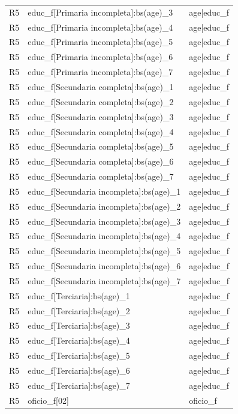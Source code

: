 \begin{longtable}{lll}
R5 & educ\_f[Primaria incompleta]:bs(age)\_3 & age|educ\_f \\
R5 & educ\_f[Primaria incompleta]:bs(age)\_4 & age|educ\_f \\
R5 & educ\_f[Primaria incompleta]:bs(age)\_5 & age|educ\_f \\
R5 & educ\_f[Primaria incompleta]:bs(age)\_6 & age|educ\_f \\
R5 & educ\_f[Primaria incompleta]:bs(age)\_7 & age|educ\_f \\
R5 & educ\_f[Secundaria completa]:bs(age)\_1 & age|educ\_f \\
R5 & educ\_f[Secundaria completa]:bs(age)\_2 & age|educ\_f \\
R5 & educ\_f[Secundaria completa]:bs(age)\_3 & age|educ\_f \\
R5 & educ\_f[Secundaria completa]:bs(age)\_4 & age|educ\_f \\
R5 & educ\_f[Secundaria completa]:bs(age)\_5 & age|educ\_f \\
R5 & educ\_f[Secundaria completa]:bs(age)\_6 & age|educ\_f \\
R5 & educ\_f[Secundaria completa]:bs(age)\_7 & age|educ\_f \\
R5 & educ\_f[Secundaria incompleta]:bs(age)\_1 & age|educ\_f \\
R5 & educ\_f[Secundaria incompleta]:bs(age)\_2 & age|educ\_f \\
R5 & educ\_f[Secundaria incompleta]:bs(age)\_3 & age|educ\_f \\
R5 & educ\_f[Secundaria incompleta]:bs(age)\_4 & age|educ\_f \\
R5 & educ\_f[Secundaria incompleta]:bs(age)\_5 & age|educ\_f \\
R5 & educ\_f[Secundaria incompleta]:bs(age)\_6 & age|educ\_f \\
R5 & educ\_f[Secundaria incompleta]:bs(age)\_7 & age|educ\_f \\
R5 & educ\_f[Terciaria]:bs(age)\_1 & age|educ\_f \\
R5 & educ\_f[Terciaria]:bs(age)\_2 & age|educ\_f \\
R5 & educ\_f[Terciaria]:bs(age)\_3 & age|educ\_f \\
R5 & educ\_f[Terciaria]:bs(age)\_4 & age|educ\_f \\
R5 & educ\_f[Terciaria]:bs(age)\_5 & age|educ\_f \\
R5 & educ\_f[Terciaria]:bs(age)\_6 & age|educ\_f \\
R5 & educ\_f[Terciaria]:bs(age)\_7 & age|educ\_f \\
R5 & oficio\_f[02] & oficio\_f \\

\end{longtable}
